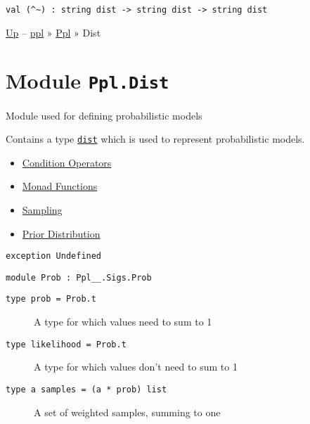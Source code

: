 \protect\hyperlink{val-ux28ux5cux255Eux7eux29}{}\texttt{val\ (\^{}\textasciitilde{})\ :\ string\ dist\ -\textgreater{}\ string\ dist\ -\textgreater{}\ string\ dist}

\href{../index.html}{Up} -- \href{../../index.html}{ppl} »
\href{../index.html}{Ppl} » Dist

\section{\texorpdfstring{Module
\texttt{Ppl.Dist}}{Module Ppl.Dist}}\label{module-ppl.dist}

Module used for defining probabilistic models

Contains a type \href{index.html\#type-dist}{\texttt{dist}} which is
used to represent probabilistic models.

\begin{itemize}
\tightlist
\item
  \protect\hyperlink{distux5fmonad}{Condition Operators}
\item
  \protect\hyperlink{distux5fmonad}{Monad Functions}
\item
  \protect\hyperlink{distux5fsample}{Sampling}
\item
  \protect\hyperlink{prior}{Prior Distribution}
\end{itemize}

\protect\hyperlink{exception-Undefined}{}\texttt{exception\ }\texttt{Undefined}

\hypertarget{module-Prob}{}
\protect\hyperlink{module-Prob}{}\texttt{module\ Prob\ :\ Ppl\_\_.Sigs.Prob}

\begin{description}
\item[{\protect\hyperlink{type-prob}{}\texttt{type\ prob}\texttt{\ =\ Prob.t}}]
A type for which values need to sum to 1
\end{description}

\begin{description}
\item[{\protect\hyperlink{type-likelihood}{}\texttt{type\ likelihood}\texttt{\ =\ Prob.t}}]
A type for which values don't need to sum to 1
\end{description}

\begin{description}
\item[{\protect\hyperlink{type-samples}{}\texttt{type\ \textquotesingle{}a\ samples}\texttt{\ =\ (\textquotesingle{}a\ *\ prob)\ list}}]
A set of weighted samples, summing to one
\end{description}

